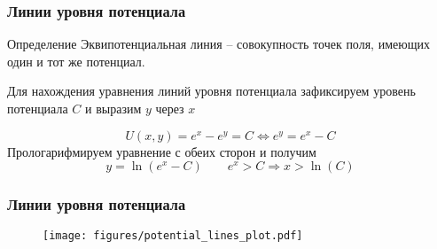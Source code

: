 \begin{frame}\frametitle{Линии уровня потенциала}
	\begin{block}{Определение}
		Эквипотенциальная линия -- совокупность точек поля, имеющих один и тот же
		потенциал.
	\end{block}

	Для нахождения уравнения линий уровня потенциала зафиксируем
	уровень потенциала \(C\) и выразим \(y\) через \(x\)

	\begin{equation}
		U(x, y) = e^x - e^y = C \Longleftrightarrow e^y = e^x - C
		\label{eq:potential_level_line}
	\end{equation}
	Прологарифмируем уравнение с обеих сторон и получим
	\begin{equation}
		y = \ln(e^x - C) \qquad e^x > C \Rightarrow x > \ln(C)
	\end{equation}

\end{frame}

\begin{frame}\frametitle{Линии уровня потенциала}
	\begin{figure}
		\centering
		\texttt{[image: figures/potential\_lines\_plot.pdf]}
	\end{figure}

\end{frame}
